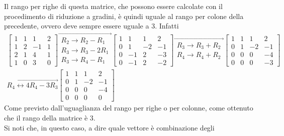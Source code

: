 Il rango per righe di questa matrice, che possono essere calcolate con il
procedimento di riduzione a gradini, è quindi uguale al rango per colone
della precedente, ovvero deve sempre essere uguale a 3. Infatti
\begin{equation}
  \label{eq:guess-jorda5}
  \begin{matrix}
    \begin{bmatrix}
      1 & 1 & 1& 2\\
      1 & 2 & -1 & 1\\
      2 & 1 & 4 & 1\\
      1 & 0 & 3 & 0
    \end{bmatrix}
    \overrightarrow{
    \begin{matrix}
      R_2\to R_2- R_1\\
      R_3\to R_3-2R_1\\
      R_3\to R_4-R_1
    \end{matrix}
    }
    \begin{bmatrix}
      1 & 1 & 1 & 2\\
      0 & 1 & -2 & -1 \\
      0 & -1 & 2 & -3\\
      0 & -1 & 2 & -2
    \end{bmatrix}
    \overrightarrow{
    \begin{matrix}
      R_3\to R_3+R_2\\
      R_4\to R_4+R_2
    \end{matrix}
    }
    \begin{bmatrix}
      1 & 1 & 1 & 2\\
      0 & 1 & -2 & -1\\
      0 & 0 & 0 & -4\\
      0 & 0 & 0 & -3
    \end{bmatrix}\\
    \overrightarrow{
    R_4\leftrightarrow 4R_4-3R_3}
    \begin{bmatrix}
      1 & 1 & 1 & 2\\
      0 & 1 & -2 & -1\\
      0 & 0 & 0 & -4\\
      0 & 0 & 0 & 0
    \end{bmatrix}
  \end{matrix}
\end{equation}
Come previsto dall'uguaglianza del rango per righe o per colonne, come
ottenuto che il rango della matrice è 3.\\
Si noti che, in questo caso, a dire quale vettore è combinazione degli
